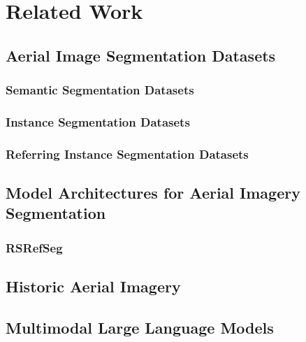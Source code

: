 \section{Related Work}

\subsection{Aerial Image Segmentation Datasets}

\subsubsection{Semantic Segmentation Datasets}


\subsubsection{Instance Segmentation Datasets}


\subsubsection{Referring Instance Segmentation Datasets}


\subsection{Model Architectures for Aerial Imagery Segmentation}

\subsubsection{RSRefSeg}


\subsection{Historic Aerial Imagery}


\subsection{Multimodal Large Language Models}




